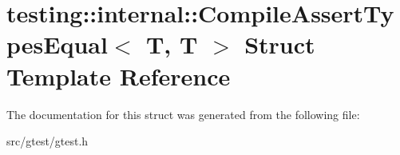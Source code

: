 \hypertarget{structtesting_1_1internal_1_1_compile_assert_types_equal_3_01_t_00_01_t_01_4}{}\section{testing\+:\+:internal\+:\+:Compile\+Assert\+Types\+Equal$<$ T, T $>$ Struct Template Reference}
\label{structtesting_1_1internal_1_1_compile_assert_types_equal_3_01_t_00_01_t_01_4}


The documentation for this struct was generated from the following file\+:\begin{DoxyCompactItemize}
\item 
src/gtest/gtest.\+h\end{DoxyCompactItemize}
